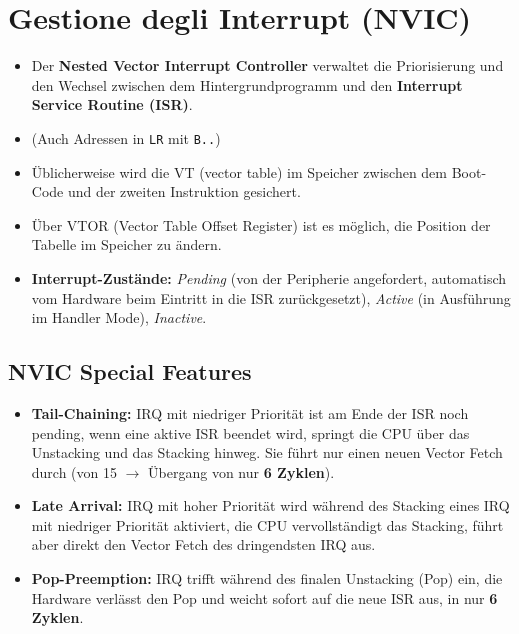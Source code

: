 \section{Gestione degli Interrupt (NVIC)}

\begin{itemize}
    \item Der \textbf{Nested Vector Interrupt Controller} verwaltet die Priorisierung und den Wechsel zwischen dem Hintergrundprogramm und den \textbf{Interrupt Service Routine (ISR)}.
    \item {} (Auch Adressen in \texttt{LR} mit \texttt{B..})
    \item Üblicherweise wird die VT (vector table) im Speicher zwischen dem Boot-Code und der zweiten Instruktion gesichert. 
    \item Über VTOR (Vector Table Offset Register) ist es möglich, die Position der Tabelle im Speicher zu ändern.
    \item \textbf{Interrupt-Zustände:} \textit{Pending} (von der Peripherie angefordert, automatisch vom Hardware beim Eintritt in die ISR zurückgesetzt), \textit{Active} (in Ausführung im Handler Mode), \textit{Inactive}.
\end{itemize}

\subsection{NVIC Special Features}
\begin{itemize}
    \item \textbf{Tail-Chaining:} IRQ mit niedriger Priorität ist am Ende der ISR noch pending,
    wenn eine aktive ISR beendet wird, springt die CPU über das Unstacking und das Stacking hinweg. Sie führt nur einen neuen Vector Fetch durch
    (von 15 $\rightarrow$ Übergang von nur \textbf{6 Zyklen}).
    \item \textbf{Late Arrival:} IRQ mit hoher Priorität wird während des Stacking eines IRQ mit niedriger Priorität aktiviert,
    die CPU vervollständigt das Stacking, führt aber direkt den Vector Fetch des dringendsten IRQ aus.
    \item \textbf{Pop-Preemption:} IRQ trifft während des finalen Unstacking (Pop) ein, die Hardware verlässt den Pop und weicht sofort auf die neue ISR aus, in nur \textbf{6 Zyklen}.
\end{itemize}

